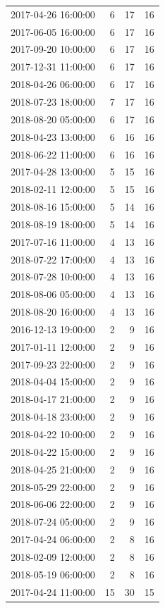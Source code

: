 \begin{tabular}{lrrr}
2017-04-26 16:00:00 & 6 & 17 & 16 \\
2017-06-05 16:00:00 & 6 & 17 & 16 \\
2017-09-20 10:00:00 & 6 & 17 & 16 \\
2017-12-31 11:00:00 & 6 & 17 & 16 \\
2018-04-26 06:00:00 & 6 & 17 & 16 \\
2018-07-23 18:00:00 & 7 & 17 & 16 \\
2018-08-20 05:00:00 & 6 & 17 & 16 \\
2018-04-23 13:00:00 & 6 & 16 & 16 \\
2018-06-22 11:00:00 & 6 & 16 & 16 \\
2017-04-28 13:00:00 & 5 & 15 & 16 \\
2018-02-11 12:00:00 & 5 & 15 & 16 \\
2018-08-16 15:00:00 & 5 & 14 & 16 \\
2018-08-19 18:00:00 & 5 & 14 & 16 \\
2017-07-16 11:00:00 & 4 & 13 & 16 \\
2018-07-22 17:00:00 & 4 & 13 & 16 \\
2018-07-28 10:00:00 & 4 & 13 & 16 \\
2018-08-06 05:00:00 & 4 & 13 & 16 \\
2018-08-20 16:00:00 & 4 & 13 & 16 \\
2016-12-13 19:00:00 & 2 & 9 & 16 \\
2017-01-11 12:00:00 & 2 & 9 & 16 \\
2017-09-23 22:00:00 & 2 & 9 & 16 \\
2018-04-04 15:00:00 & 2 & 9 & 16 \\
2018-04-17 21:00:00 & 2 & 9 & 16 \\
2018-04-18 23:00:00 & 2 & 9 & 16 \\
2018-04-22 10:00:00 & 2 & 9 & 16 \\
2018-04-22 15:00:00 & 2 & 9 & 16 \\
2018-04-25 21:00:00 & 2 & 9 & 16 \\
2018-05-29 22:00:00 & 2 & 9 & 16 \\
2018-06-06 22:00:00 & 2 & 9 & 16 \\
2018-07-24 05:00:00 & 2 & 9 & 16 \\
2017-04-24 06:00:00 & 2 & 8 & 16 \\
2018-02-09 12:00:00 & 2 & 8 & 16 \\
2018-05-19 06:00:00 & 2 & 8 & 16 \\
2017-04-24 11:00:00 & 15 & 30 & 15 \\

\end{tabular}
